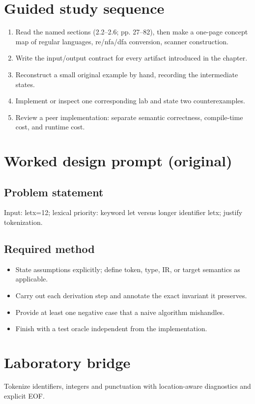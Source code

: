\documentclass[10pt,letterpaper]{article}
\begin{document}
\section{Guided study sequence}
\begin{enumerate}
\item Read the named sections (2.2--2.6; pp. 27--82), then make a one-page concept map of regular languages, re/nfa/dfa conversion, scanner construction.
\item Write the input/output contract for every artifact introduced in the chapter.
\item Reconstruct a small original example by hand, recording the intermediate states.
\item Implement or inspect one corresponding lab and state two counterexamples.
\item Review a peer implementation: separate semantic correctness, compile-time cost, and runtime cost.
\end{enumerate}

\section{Worked design prompt (original)}
\subsection{Problem statement}
Input: letx=12; lexical priority: keyword let versus longer identifier letx; justify tokenization.
\subsection{Required method}
\begin{itemize}
\item State assumptions explicitly; define token, type, IR, or target semantics as applicable.
\item Carry out each derivation step and annotate the exact invariant it preserves.
\item Provide at least one negative case that a naive algorithm mishandles.
\item Finish with a test oracle independent from the implementation.
\end{itemize}


\section{Laboratory bridge}
Tokenize identifiers, integers and punctuation with location-aware diagnostics and explicit EOF.
\end{document}
